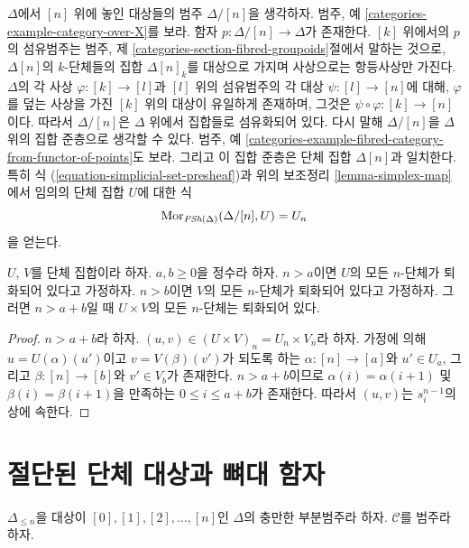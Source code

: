 \begin{example}
\label{example-simplex-category}
$\Delta$에서 $[n]$ 위에 놓인 대상들의 범주 $\Delta/[n]$을 생각하자.
범주, 예 \ref{categories-example-category-over-X}를 보라.
함자 $p : \Delta/[n] \to \Delta$가 존재한다.
$[k]$ 위에서의 $p$의 섬유범주는 범주, 제
\ref{categories-section-fibred-groupoids}절에서 말하는 것으로,
$\Delta[n]$의 $k$-단체들의 집합 $\Delta[n]_k$를 대상으로 가지며
사상으로는 항등사상만 가진다.
$\Delta$의 각 사상 $\varphi : [k] \to [l]$과 $[l]$ 위의 섬유범주의
각 대상 $\psi : [l] \to [n]$에 대해, $\varphi$를 덮는 사상을 가진
$[k]$ 위의 대상이 유일하게 존재하며, 그것은
$\psi \circ \varphi : [k] \to [n]$이다. 따라서 $\Delta/[n]$은
$\Delta$ 위에서 집합들로 섬유화되어 있다. 다시 말해
$\Delta/[n]$을 $\Delta$ 위의 집합 준층으로 생각할 수 있다.
범주, 예 \ref{categories-example-fibred-category-from-functor-of-points}도 보라.
그리고 이 집합 준층은 단체 집합 $\Delta[n]$과 일치한다.
특히 식 (\ref{equation-simplicial-set-presheaf})과 위의 보조정리
\ref{lemma-simplex-map}에서 임의의 단체 집합 $U$에 대한 식
$$
\mathop{\mathrm{Mor}}\nolimits_{\textit{PSh}(\Delta)}(\Delta/[n], U) = U_n
$$
을 얻는다.
\end{example}

\begin{lemma}
\label{lemma-product-degenerate}
$U$, $V$를 단체 집합이라 하자.
$a, b \geq 0$을 정수라 하자.
$n > a$이면 $U$의 모든 $n$-단체가 퇴화되어 있다고 가정하자.
$n > b$이면 $V$의 모든 $n$-단체가 퇴화되어 있다고 가정하자.
그러면 $n > a + b$일 때 $U \times V$의 모든 $n$-단체는 퇴화되어 있다.
\end{lemma}

\begin{proof}
$n > a + b$라 하자.
$(u, v) \in (U \times V)_n = U_n \times V_n$라 하자.
가정에 의해 $u = U(\alpha)(u')$이고 $v = V(\beta)(v')$가 되도록 하는
$\alpha : [n] \to [a]$와 $u' \in U_a$, 그리고
$\beta : [n] \to [b]$와 $v' \in V_b$가 존재한다.
$n > a + b$이므로 $\alpha(i) = \alpha(i + 1)$ 및
$\beta(i) = \beta(i + 1)$을 만족하는 $0 \leq i \leq a + b$가 존재한다.
따라서 $(u, v)$는 $s^{n - 1}_i$의 상에 속한다.
\end{proof}



\section{절단된 단체 대상과 뼈대 함자}
\label{section-skeleton}

\noindent
$\Delta_{\leq n}$을 대상이 $[0], [1], [2], \ldots, [n]$인
$\Delta$의 충만한 부분범주라 하자. $\mathcal{C}$를 범주라 하자.

